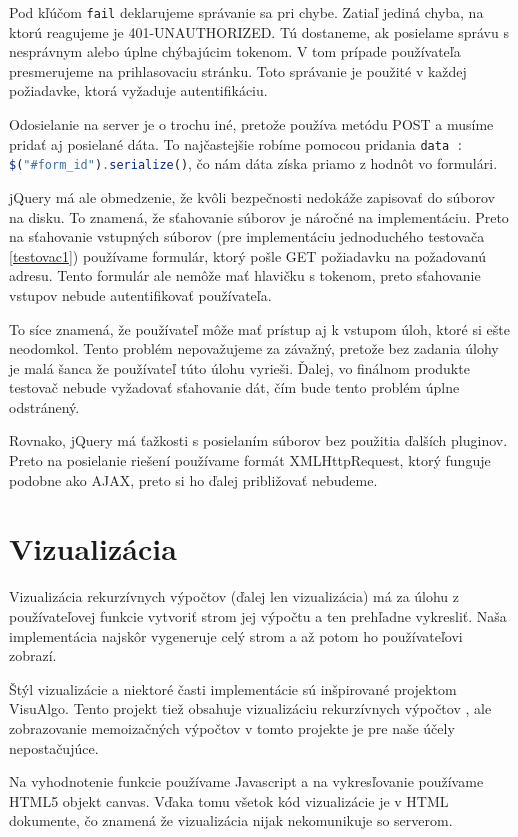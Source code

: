 Pod kľúčom \lstinline[language=Javascript]|fail| deklarujeme správanie sa pri chybe. Zatiaľ jediná
chyba, na ktorú reagujeme je 401-UNAUTHORIZED. Tú dostaneme, ak posielame
správu s nesprávnym alebo úplne chýbajúcim tokenom. V tom prípade používateľa presmerujeme
na prihlasovaciu stránku. Toto správanie je použité v každej požiadavke, ktorá
vyžaduje autentifikáciu.

Odosielanie na server je o trochu iné, pretože používa metódu POST a musíme pridať
aj posielané dáta. To najčastejšie robíme pomocou pridania \newline
\lstinline[language=Javascript]{data : $("#form_id").serialize()}, čo nám dáta
získa priamo z hodnôt vo formulári.

jQuery má ale obmedzenie, že kvôli bezpečnosti nedokáže zapisovať do súborov na disku.
To znamená, že sťahovanie súborov je náročné na implementáciu. Preto na sťahovanie
vstupných súborov (pre implementáciu jednoduchého testovača \ref{testovac1}) používame
formulár, ktorý pošle GET požiadavku na požadovanú adresu. Tento formulár ale nemôže mať
hlavičku s tokenom, preto sťahovanie vstupov nebude autentifikovať používateľa.

To síce znamená, že používateľ môže mať prístup aj k vstupom úloh, ktoré si ešte neodomkol.
Tento problém nepovažujeme za závažný, pretože bez zadania úlohy je malá šanca že používateľ
túto úlohu vyrieši. Ďalej, vo finálnom produkte testovač nebude vyžadovať sťahovanie
dát, čím bude tento problém úplne odstránený.

Rovnako, jQuery má ťažkosti s posielaním súborov bez použitia ďalších pluginov.
Preto na posielanie riešení používame formát XMLHttpRequest, ktorý
funguje podobne ako AJAX, preto si ho ďalej približovať nebudeme.

\section{Vizualizácia}
Vizualizácia rekurzívnych výpočtov (ďalej len vizualizácia) má za úlohu z používateľovej
funkcie vytvoriť strom jej výpočtu a ten prehľadne vykresliť. Naša implementácia
najskôr vygeneruje celý strom a až potom ho používateľovi zobrazí.

Štýl vizualizácie a niektoré časti implementácie sú inšpirované projektom
VisuAlgo. Tento projekt tiež obsahuje vizualizáciu rekurzívnych výpočtov \cite{visualgo},
ale zobrazovanie memoizačných výpočtov v tomto projekte je pre naše účely nepostačujúce.

Na vyhodnotenie funkcie používame Javascript a na vykresľovanie používame HTML5 objekt canvas.
Vďaka tomu všetok kód vizualizácie je v HTML dokumente, čo znamená že vizualizácia nijak nekomunikuje so serverom.


